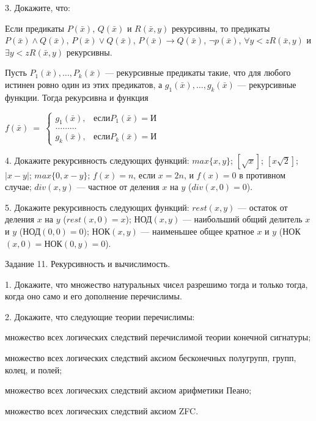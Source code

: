 \documentclass[a4paper,11pt]{article}
\begin{document}
3. Докажите, что: 

Если предикаты $P(\bar{x})$, $Q(\bar{x})$ и
$R(\bar{x}, y)$ рекурсивны, то предикаты $P(\bar{x}) \wedge
Q(\bar{x})$, $P(\bar{x}) \vee Q(\bar{x})$, $P(\bar{x}) \rightarrow
Q(\bar{x})$, $\neg p(\bar{x})$, $\forall y < z R(\bar{x}, y)$
и $\exists y < z R(\bar{x}, y)$ рекурсивны. 

Пусть
$P_1(\bar{x}),\ldots, P_k(\bar{x})$ --- рекурсивные предикаты
такие, что для любого истинен ровно один из этих предикатов, а
$g_1(\bar{x}),\ldots, g_k(\bar{x})$ --- рекурсивные функции. Тогда
рекурсивна и функция 

$f(\bar{x})~=~
\begin{cases}
g_1(\bar{x}),&\text{если} P_1(\bar{x})=\text{И}\\
\ldots\ldots\ldots\\
g_k(\bar{x}),&\text{если} P_k(\bar{x})=\text{И}
\end{cases}$ 
\medskip

4. Докажите рекурсивность следующих функций: $max\{x,y\}$; $[\sqrt{x}]$; $[x\sqrt{2}]$; $|x-y|$; $max\{0,x-y\}$; $f(x)=n$, если $x=2n$, и $f(x)=0$ в противном случае; $div(x,y)$ --- частное от деления $x$ на $y$ ($div(x,0) = 0$). 
\medskip

5. Докажите рекурсивность следующих функций: 
$rest(x,y)$ --- остаток от деления $x$ на $y$ ($rest(x,0) = x$);
НОД$(x,y)$ --- наибольший общий делитель $x$ и $y$ (НОД$(0,0) = 0$);
НОК$(x,y)$ --- наименьшее общее кратное $x$ и $y$ (НОК$(x,0) =$НОК$(0,y) = 0$).





\pagebreak


\begin{center}
Задание 11. Рекурсивность и вычислимость. 
\end{center}

1. Докажите, что множество натуральных чисел разрешимо тогда и только тогда, когда оно само и его дополнение перечислимы. 
\medskip

2. Докажите, что следующие теории перечислимы: 

множество всех логических следствий перечислимой теории конечной сигнатуры; 

множество всех логических следствий аксиом бесконечных полугрупп, групп, колец, и полей;

множество всех логических следствий аксиом арифметики Пеано;

множество всех логических следствий аксиом ZFC. 
\medskip
\end{document}
